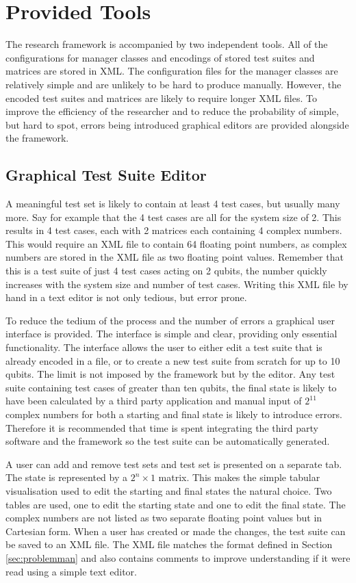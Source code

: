 \section{Provided Tools}
The research framework is accompanied by two independent tools.
All of the configurations for manager classes and encodings of stored test suites and matrices are stored in XML.
The configuration files for the manager classes are relatively simple and are unlikely to be hard to produce manually.
However, the encoded test suites and matrices are likely to require longer XML files.
To improve the efficiency of the researcher and to reduce the probability of simple, but hard to spot, errors being introduced graphical editors are provided alongside the framework.

\subsection{Graphical Test Suite Editor}
\label{sec:indtestsuiteeditor}
A meaningful test set is likely to contain at least 4 test cases, but usually many more.
Say for example that the 4 test cases are all for the system size of 2.
This results in 4 test cases, each with 2 matrices each containing 4 complex numbers.
This would require an XML file to contain 64 floating point numbers, as complex numbers are stored in the XML file as two floating point values.
Remember that this is a test suite of just 4 test cases acting on 2 qubits, the number quickly increases with the system size and number of test cases.
Writing this XML file by hand in a text editor is not only tedious, but error prone.

To reduce the tedium of the process and the number of errors a graphical user interface is provided.
The interface is simple and clear, providing only essential functionality.
The interface allows the user to either edit a test suite that is already encoded in a file, or to create a new test suite from scratch for up to 10 qubits.
The limit is not imposed by the framework but by the editor.
Any test suite containing test cases of greater than ten qubits, the final state is likely to have been calculated by a third party application and manual input of $2^{11}$ complex numbers for both a starting and final state is likely to introduce errors.
Therefore it is recommended that time is spent integrating the third party software and the framework so the test suite can be automatically generated.

A user can add and remove test sets and test set is presented on a separate tab.
The state is represented by a $2^n\times{1}$ matrix.
This makes the simple tabular visualisation used to edit the starting and final states the natural choice.
Two tables are used, one to edit the starting state and one to edit the final state.
The complex numbers are not listed as two separate floating point values but in Cartesian form.
When a user has created or made the changes, the test suite can be saved to an XML file.
The XML file matches the format defined in Section \ref{sec:problemman} and also contains comments to improve understanding if it were read using a simple text editor.

